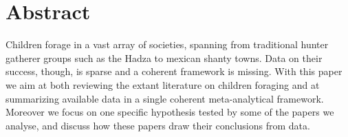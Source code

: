 \section{Abstract}
Children forage in a vast array of societies, spanning from traditional hunter gatherer groups such as the Hadza to mexican shanty towns. Data on their success, though, is sparse and a coherent framework is missing. With this paper we aim at both reviewing the extant literature on children foraging and at summarizing available data in a single coherent meta-analytical framework. Moreover we focus on one specific hypothesis tested by some of the papers we analyse, and discuss how these papers draw their conclusions from data. 








